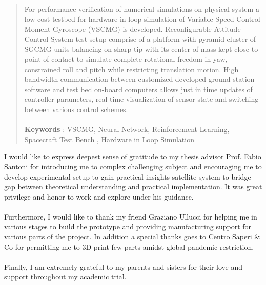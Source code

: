 \documentclass[english,oneside,LaM,binding=0.6cm]{sapthesis}
\begin{document}
\begin{abstract}
For performance verification of numerical simulations on physical system a low-cost testbed for hardware in loop simulation of Variable Speed Control Moment Gyroscope (VSCMG) is developed. Reconfigurable Attitude Control System test setup comprise of a platform with pyramid cluster of SGCMG units balancing on sharp tip with its center of mass kept close to point of contact to simulate complete rotational freedom in yaw, constrained roll and pitch while restricting translation motion. High bandwidth communication between customized developed ground station software and test bed on-board computers allows just in time updates of controller parameters, real-time visualization of sensor state and switching between various control schemes.
\\
\\
\textbf{Keywords} : VSCMG, Neural Network, Reinforcement Learning, Spacecraft Test Bench , Hardware in Loop Simulation


\end{abstract}

\begin{acknowledgments}
{}
I would like to express deepest sense of gratitude to my thesis advisor Prof. Fabio Santoni for introducing me to complex challenging subject and encouraging me to develop experimental setup to gain practical insights satellite system to bridge gap between theoretical understanding and practical implementation. It was great privilege and honor to work and explore under his guidance. \\
\\
Furthermore, I would like to thank my friend Graziano Ullucci for helping me in various stages to build the prototype and providing manufacturing support for various parts of the project. In addition a special thanks goes to Centro Saperi & Co for permitting me to 3D print few parts amidst global pandemic restriction. \\
\\
Finally, I am extremely grateful to my parents and sisters for their love and support throughout my academic trial.

\end{acknowledgments}


\renewcommand{\contentsname}{Table of Contents}
\tableofcontents

\listoftables

\listoffigures
\end{document}

